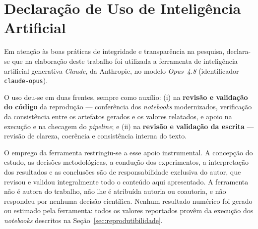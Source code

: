 \documentclass[sigconf, nonacm]{acmart}
\begin{document}
\section{Declaração de Uso de Inteligência Artificial}
\label{sec:declaracao-ia}

Em atenção às boas práticas de integridade e transparência na pesquisa,
declara-se que na elaboração deste trabalho foi utilizada a ferramenta de
inteligência artificial generativa \emph{Claude}, da Anthropic, no modelo
\emph{Opus~4.8} (identificador \texttt{claude\allowbreak-opus}).

O uso deu-se em duas frentes, sempre como auxílio: (i) na \textbf{revisão e
validação do código} da reprodução --- conferência dos \emph{notebooks}
modernizados, verificação da consistência entre os artefatos gerados e os
valores relatados, e apoio na execução e na checagem do \emph{pipeline}; e (ii)
na \textbf{revisão e validação da escrita} --- revisão de clareza, coerência e
consistência interna do texto.

O emprego da ferramenta restringiu-se a esse apoio instrumental. A concepção do
estudo, as decisões metodológicas, a condução dos experimentos, a interpretação
dos resultados e as conclusões são de responsabilidade exclusiva do autor, que
revisou e validou integralmente todo o conteúdo aqui apresentado. A ferramenta
não é autora do trabalho, não lhe é atribuída autoria ou coautoria, e não
respondeu por nenhuma decisão científica. Nenhum resultado numérico foi gerado
ou estimado pela ferramenta: todos os valores reportados provêm da execução dos
\emph{notebooks} descritos na Seção~\ref{sec:reprodutibilidade}.



\end{document}
